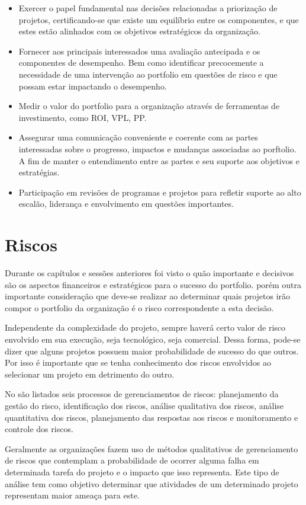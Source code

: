 \documentclass[12pt,a4paper,ruledheader,tocpage=prefix,floatnumber=continuous,pagestart=folhaderosto,font=times]{abnt}
\begin{document}
\begin{itemize}
 \item Exercer o papel fundamental nas decisões relacionadas a priorização de projetos, certificando-se que existe um equilíbrio entre os componentes, e que
       estes estão alinhados com os objetivos estratégicos da organização.
 \item Fornecer aos principais interessados uma avaliação antecipada e os componentes de desempenho. Bem como identificar precocemente a necessidade de 
       uma intervenção ao portfolio em questões de risco e que possam estar impactando o desempenho.
 \item Medir o valor do portfolio para a organização através de ferramentas de investimento, como ROI, VPL, PP.
 \item Assegurar uma comunicação conveniente e coerente com as partes interessadas sobre o progresso, impactos e mudanças associadas ao porftolio. A fim de
       manter o entendimento entre as partes e seu suporte aos objetivos e estratégias.
 \item Participação em revisões de programas e projetos para refletir suporte ao alto escalão, liderança e envolvimento em questões importantes.
\end{itemize}

\section{Riscos}
Durante os capítulos e sessões anteriores foi visto o quão importante e decisivos são os aspectos financeiros e estratégicos para o sucesso do portfolio. porém
outra importante consideração que deve-se realizar ao determinar quais projetos irão compor o portfolio da organização é o risco correspondente a esta decisão.

Independente da complexidade do projeto, sempre haverá certo valor de risco envolvido em sua execução, seja tecnológico, seja comercial. Dessa forma, pode-se
dizer que alguns projetos possuem maior probabilidade de sucesso do que outros. Por isso é importante que se tenha conhecimento dos riscos envolvidos ao
selecionar um projeto em detrimento do outro.

No  são listados seis processos de gerenciamentos de riscos: planejamento da gestão do risco, identificação dos riscos, análise qualitativa dos
riscos, análise quantitativa dos riscos, planejamento das respostas aos riscos e monitoramento e controle dos riscos.

Geralmente as organizações fazem uso de métodos qualitativos de gerenciamento de riscos que contemplam a probabilidade de ocorrer alguma falha em determinada
tarefa do projeto e o impacto que isso representa. Este tipo de análise tem como objetivo determinar que atividades de um determinado projeto representam
maior ameaça para este.
\end{document}
